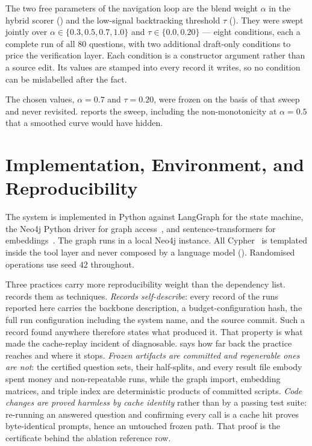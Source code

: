 The two free parameters of the navigation loop are the blend weight $\alpha$ in
the hybrid scorer () and the low-signal backtracking threshold
$\tau$ (). They were swept jointly over $\alpha \in
\{0.3, 0.5, 0.7, 1.0\}$ and $\tau \in \{0.0, 0.20\}$ --- eight conditions, each
a complete run of all $80$ questions, with two additional draft-only conditions
to price the verification layer. Each condition is a constructor argument rather
than a source edit. Its values are stamped into every record it writes, so
no condition can be mislabelled after the fact.

The chosen values, $\alpha = 0.7$ and $\tau = 0.20$, were frozen on the basis of
that sweep and never revisited.  reports the sweep,
including the non-monotonicity at $\alpha = 0.5$ that a smoothed curve would
have hidden.

\section{Implementation, Environment, and
Reproducibility}\label{sec:implementation}

The system is implemented in Python against LangGraph for the state machine, the
Neo4j Python driver for graph access~\cite{robinson2015graph}, and
sentence-transformers for embeddings~\cite{reimers2019sentence}. The graph runs
in a local Neo4j instance. All Cypher~\cite{francis2018cypher} is templated
inside the tool layer and never composed by a language model
(). Randomised operations use seed $42$ throughout.

Three practices carry more reproducibility weight than the dependency list.
 records them as techniques. \emph{Records
self-describe}: every record of the runs reported here carries the backbone
description, a budget-configuration hash, the full run configuration including
the system name, and the source commit. Such a record found anywhere therefore
states what produced it. That property is what made the cache-replay incident
of  diagnosable.  says how far
back the practice reaches and where it stops. \emph{Frozen artifacts are
committed and regenerable ones are not}: the certified question sets, their
half-splits, and every result file embody spent money and non-repeatable runs,
while the graph import, embedding matrices, and triple index are deterministic
products of committed scripts. \emph{Code changes are proved harmless by cache
identity} rather than by a passing test suite: re-running an answered question
and confirming every call is a cache hit proves byte-identical prompts, hence
an untouched frozen path. That proof is the certificate behind the ablation
reference row.

